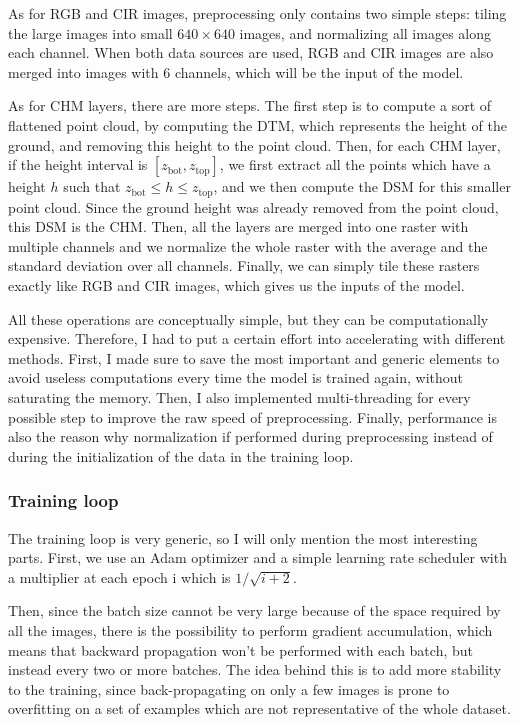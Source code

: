 \documentclass[
  letterpaper,
  DIV=11,
  numbers=noendperiod]{scrartcl}
\begin{document}
As for RGB and CIR images, preprocessing only contains two simple steps:
tiling the large images into small \(640 \times 640\) images, and
normalizing all images along each channel. When both data sources are
used, RGB and CIR images are also merged into images with 6 channels,
which will be the input of the model.

As for CHM layers, there are more steps. The first step is to compute a
sort of flattened point cloud, by computing the DTM, which represents
the height of the ground, and removing this height to the point cloud.
Then, for each CHM layer, if the height interval is
\([z_\text{bot}, z_\text{top}]\), we first extract all the points which
have a height \(h\) such that \(z_\text{bot} \leq h \leq z_\text{top}\),
and we then compute the DSM for this smaller point cloud. Since the
ground height was already removed from the point cloud, this DSM is the
CHM. Then, all the layers are merged into one raster with multiple
channels and we normalize the whole raster with the average and the
standard deviation over all channels. Finally, we can simply tile these
rasters exactly like RGB and CIR images, which gives us the inputs of
the model.

All these operations are conceptually simple, but they can be
computationally expensive. Therefore, I had to put a certain effort into
accelerating with different methods. First, I made sure to save the most
important and generic elements to avoid useless computations every time
the model is trained again, without saturating the memory. Then, I also
implemented multi-threading for every possible step to improve the raw
speed of preprocessing. Finally, performance is also the reason why
normalization if performed during preprocessing instead of during the
initialization of the data in the training loop.

\subsubsection{Training loop}\label{training-loop}

The training loop is very generic, so I will only mention the most
interesting parts. First, we use an Adam optimizer and a simple learning
rate scheduler with a multiplier at each epoch i which is
\(1/\sqrt{i+2}\).

Then, since the batch size cannot be very large because of the space
required by all the images, there is the possibility to perform gradient
accumulation, which means that backward propagation won't be performed
with each batch, but instead every two or more batches. The idea behind
this is to add more stability to the training, since back-propagating on
only a few images is prone to overfitting on a set of examples which are
not representative of the whole dataset.
\end{document}
